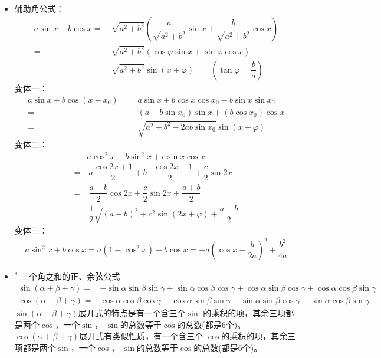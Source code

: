 \begin{itemize}[leftmargin=\inteval{\myitemleftmargin}pt,itemsep=
   \inteval{\myitemitempsep}pt,topsep=\inteval{\myitemtopsep}pt]
\item 辅助角公式：
\begin{align*}
a\sin x+b\cos x 
=&\  \sqrt{a^2+b^2}\left(\dfrac{a}{\sqrt{a^2+b^2}}\sin x+\dfrac{b}{\sqrt{a^2+b^2}}\cos x \right) \\
=&\  \sqrt{a^2+b^2}\left(\cos\varphi\sin x+\sin\varphi\cos x \right) \\
=&\  \sqrt{a^2+b^2}\sin(x+\varphi) \quad\quad 
\left(\tan \varphi=\dfrac{b}{a}\right)
\end{align*}
变体一：
\begin{align*}
a\sin x+b\cos (x+x_0) 
=&\  a\sin x+b\cos x\cos x_0-b\sin x\sin x_0 \\
=&\  (a-b\sin x_0)\sin x+(b\cos x_0)\cos x \\
=&\  \sqrt{a^2+b^2-2ab\sin x_0}\sin(x+\varphi) 
\end{align*}
变体二：
\begin{align*}
&a\cos^2x+b\sin^2x+c\sin x\cos x \\
=&\  a\dfrac{\cos2x+1}{2} +b\dfrac{-\cos2x+1}{2}+\dfrac{c}{2}\sin2x \\
=&\  \dfrac{a-b}{2}\cos2x+\dfrac{c}{2}\sin2x+\dfrac{a+b}{2} \\
=&\  \dfrac{1}{2}\sqrt{(a-b)^2+c^2}\sin(2x+\varphi)+\dfrac{a+b}{2}
\end{align*}
变体三：
\begin{align*}
a\sin^2x+b\cos x=a(1-\cos^2x)+b\cos x=
-a\left( \cos x-\dfrac{b}{2a}\right) ^2+\dfrac{b^2}{4a}
\end{align*}

\item $ ^* $ 三个角之和的正、余弦公式
{\small 
    \begin{align}
    \sin(\alpha+\beta+\gamma)
    =&-\sin\alpha\sin\beta\sin\gamma
    +\sin \alpha \cos \beta \cos \gamma  + \cos \alpha \sin \beta 
    \cos \gamma + \cos \alpha \cos \beta \sin \gamma  \label{sin三个角之和} \\
    \cos(\alpha+\beta+\gamma) 
    =& \cos \alpha \cos \beta \cos\gamma
    -\cos\alpha  \sin \beta \sin \gamma - \sin \alpha \sin \beta 
    \cos \gamma - \sin \alpha \cos \beta \sin \gamma  \label{cos三个角之和}
\end{align} 
}
$ \sin(\alpha+\beta+\gamma) $展开式的特点是有一个含三个$ \sin $
的乘积的项，其余三项都是两个$ \cos $，一个$ \sin $，
$ \sin $的总数等于$ \cos $的总数(都是6个)。
$ \cos(\alpha+\beta+\gamma) $展开式有类似性质，有一个含三个
$ \cos $的乘积的项，其余三项都是两个$ \sin $，一个$ \cos $，
$ \sin $的总数等于$ \cos $的总数(都是6个)。


\end{itemize}
